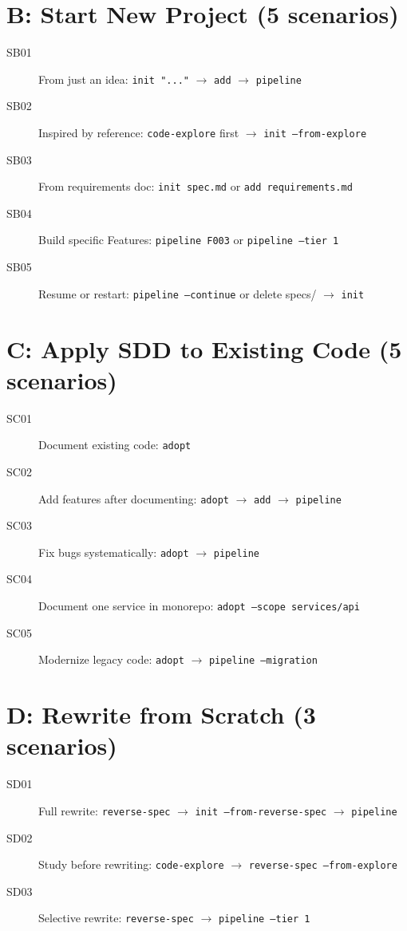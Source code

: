 \documentclass[11pt,a4paper,openright,twoside]{report}
\begin{document}
\section{B: Start New Project (5 scenarios)}

\begin{description}
  \item[SB01] From just an idea: \texttt{init "..."} $\rightarrow$ \texttt{add} $\rightarrow$ \texttt{pipeline}
  \item[SB02] Inspired by reference: \texttt{code-explore} first $\rightarrow$ \texttt{init --from-explore}
  \item[SB03] From requirements doc: \texttt{init spec.md} or \texttt{add requirements.md}
  \item[SB04] Build specific Features: \texttt{pipeline F003} or \texttt{pipeline --tier 1}
  \item[SB05] Resume or restart: \texttt{pipeline --continue} or delete specs/ $\rightarrow$ \texttt{init}
\end{description}

\section{C: Apply SDD to Existing Code (5 scenarios)}

\begin{description}
  \item[SC01] Document existing code: \texttt{adopt}
  \item[SC02] Add features after documenting: \texttt{adopt} $\rightarrow$ \texttt{add} $\rightarrow$ \texttt{pipeline}
  \item[SC03] Fix bugs systematically: \texttt{adopt} $\rightarrow$ \texttt{pipeline}
  \item[SC04] Document one service in monorepo: \texttt{adopt --scope services/api}
  \item[SC05] Modernize legacy code: \texttt{adopt} $\rightarrow$ \texttt{pipeline --migration}
\end{description}

\section{D: Rewrite from Scratch (3 scenarios)}

\begin{description}
  \item[SD01] Full rewrite: \texttt{reverse-spec} $\rightarrow$ \texttt{init --from-reverse-spec} $\rightarrow$ \texttt{pipeline}
  \item[SD02] Study before rewriting: \texttt{code-explore} $\rightarrow$ \texttt{reverse-spec --from-explore}
  \item[SD03] Selective rewrite: \texttt{reverse-spec} $\rightarrow$ \texttt{pipeline --tier 1}
\end{description}
\end{document}
